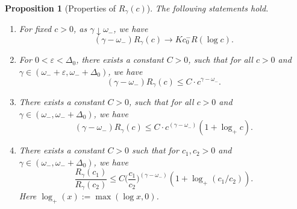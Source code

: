 \documentclass[12pt]{article}
\numberwithin{equation}{section}
\theoremstyle{plain}
\newtheorem{prop}[thm]{Proposition}
\theoremstyle{definition}
\begin{document}
\begin{prop}[Properties of $R_{\gamma}(c)$]\label{prop: property R gamma c}
The following statements hold.

\begin{enumerate}
    \item For fixed $c>0$, as $\gamma\downarrow \omega_-$, we have
    \begin{equation}\label{eq: R gamma c asymptotics}
    (\gamma-\omega_-)R_{\gamma}(c)\to Kc_0^-R(\log c).
    \end{equation}

    \item For $0<\varepsilon<\Delta_0$, there exists a constant $C>0$, such that for all $c>0$ and $\gamma \in (\omega_-+\varepsilon, \omega_-+\Delta_0)$, we have
    \begin{equation}\label{eq: R gamma c bounds}
    (\gamma - \omega_-)R_{\gamma}(c) \leq C\cdot c^{\gamma-\omega_-}.
    \end{equation}

    \item There exists a constant $C>0$, such that for all $c>0$ and $\gamma \in (\omega_-, \omega_-+\Delta_0)$, we have
    \begin{equation}\label{eq: R gamma c bounds 2}
    (\gamma - \omega_-)R_{\gamma}(c) \leq C\cdot c^{(\gamma-\omega_-)}(1+\log_+ c).
    \end{equation}
    \item There exists a constant $C>0$ such that for $c_1, c_2>0$ and $\gamma \in (\omega_-, \omega_-+\Delta_0)$, we have
    \begin{equation}\label{eq: R gamma c fraction bounds}
    \frac{R_{\gamma}(c_1)}{R_{\gamma}(c_2)}\leq C \Big(\frac{c_1}{c_2}\Big)^{(\gamma-\omega_-)}(1+\log_+(c_1/c_2)).
    \end{equation}
    Here $\log_+(x):=\max(\log x, 0)$.
\end{enumerate}

\end{prop}
\end{document}
